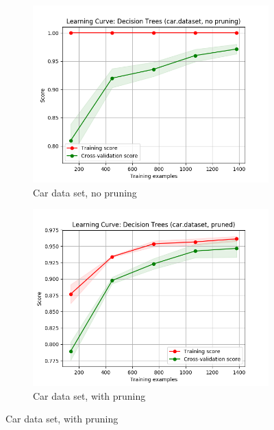 \documentclass{article}
\begin{document}
    \begin{figure}[htb]
    \centering

    \begin{subfigure}{0.5\textwidth}
      \includegraphics[width=\linewidth]{out/decision_tree_pruning/car-noprune-learning.png}
      \caption{Car data set, no pruning}
      \label{fig:dt-learning-1}
    \end{subfigure}\hfil
    \begin{subfigure}{0.5\textwidth}
      \includegraphics[width=\linewidth]{out/decision_tree_pruning/car-prune-learning.png}
      \caption{Car data set, with pruning}
      \label{fig:dt-learning-2}
    \end{subfigure}


\end{figure}
\end{document}
